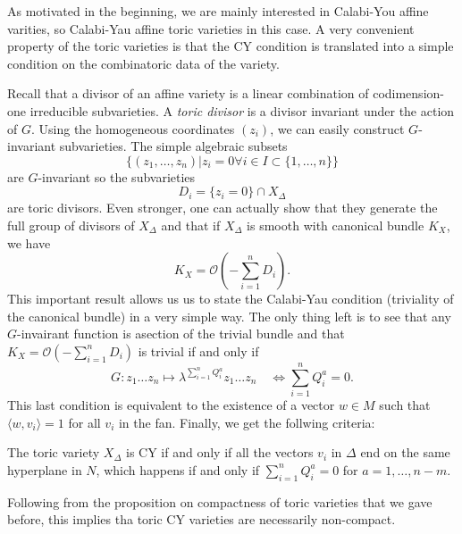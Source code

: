         As motivated in the beginning, we are mainly interested in Calabi-You affine varities, so Calabi-Yau affine toric varieties in this case. A very convenient property of the toric varieties is that the CY condition is translated into a simple condition on the combinatoric data of the variety.

        Recall that a divisor of an affine variety is a linear combination of codimension-one irreducible subvarieties. A \emph{toric divisor} is a divisor invariant under the action of $G$. Using the homogeneous coordinates $(z_i)$, we can easily construct $G$-invariant subvarieties. The simple algebraic subsets
        \begin{equation}
            \{(z_1,\dots,z_n)|z_i=0 \forall i\in I\subset\{1,\dots,n\}\}
        \end{equation}
        are $G$-invariant so the subvarieties
        \begin{equation}
            D_i=\{z_i=0\}\cap X_\Delta
        \end{equation}
        are toric divisors. Even stronger, one can actually show that they generate the full group of divisors of $X_\Delta$ and that if $X_\Delta$ is smooth with canonical bundle $K_X$, we have
        \begin{equation}
            K_X=\mathcal{O}\left(-\sum^n_{i=1} D_i\right).
        \end{equation}
        This important result allows us us to state the Calabi-Yau condition (triviality of the canonical bundle) in a very simple way. The only thing left is to see that any $G$-invairant function is asection of the trivial bundle and that $K_X=\mathcal{O}\left(-\sum^n_{i=1} D_i\right)$ is trivial if and only if
        \begin{equation}
            G:z_1\dots z_n\mapsto\lambda^{\sum^n_{i=1}Q^a_i}z_1\dots z_n\quad\Leftrightarrow\sum^n_{i=1}Q^a_i=0.
        \end{equation}
        This last condition is equivalent to the existence of a vector $w\in M$ such that $\langle w,v_i\rangle=1$ for all $v_i$ in the fan. Finally, we get the follwing criteria:
        \begin{prop*}
            The toric variety $X_\Delta$ is CY if and only if all the vectors $v_i$ in $\Delta$ end on the same hyperplane in $N$, which happens if and only if $\sum^n_{i=1}Q^a_i=0$ for $a=1,\dots,n-m$.
        \end{prop*}

        Following from the proposition on compactness of toric varieties that we gave before, this implies tha toric CY varieties are necessarily non-compact.

